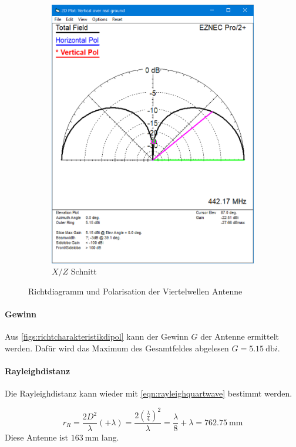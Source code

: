 \documentclass[colorlinks = true, allcolors = black, ngerman, 11pt,
a4paper, twoside, titlepage]{article}
\numberwithin{figure}{section}
\renewcommand{\si}[2]{\SI{#1}{#2}}
\begin{document}
\begin{figure}[h]
\begin{subfigure}{0.5\textwidth}
			\includegraphics[height=1.2\textwidth]{imgs/elev_richtchar_quartwave.png}
			\caption{$X/Z$ Schnitt}
			\label{fig:elevquartwave}
		\end{subfigure}
		\caption{Richtdiagramm und Polarisation der Viertelwellen Antenne}
		\label{figs:richtcharakteristikquartwave}
	\end{figure}
	
	\paragraph{Gewinn}
	Aus \cref{figs:richtcharakteristikdipol} kann der Gewinn $G$ der Antenne ermittelt werden. Dafür wird das Maximum des Gesamtfeldes abgelesen $G=\si{5.15}{\decibel i}$.
	
	\paragraph{Rayleighdistanz}
	Die Rayleighdistanz kann wieder mit \cref{eqn:rayleighquartwave} bestimmt werden.
	
	\begin{equation} \label{eqn:rayleighquartwave}
		r_{R}=\frac{2D^{2}}{\lambda}(+\lambda) = \frac{2 \left(\frac{\lambda}{4}\right)^2}{\lambda} = \frac{\lambda}{8} + \lambda = \si{762.75}{\milli\meter}
	\end{equation}
	Diese Antenne ist $\si{163}{\milli\meter}$ lang.
	
\end{document}
